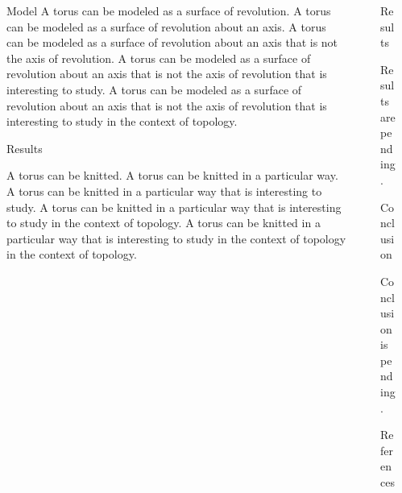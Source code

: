 \documentclass{beamer}
\newlength{\sepwidth}
\newlength{\colwidth}
\newcommand{\separatorcolumn}{\begin{column}{\sepwidth}\end{column}}
\begin{document}
\begin{frame}[t]
\begin{columns}[t]
\begin{column}{\colwidth}
\begin{block}{Model}
A torus can be modeled as a surface of revolution. A torus can be modeled as a surface of revolution about an axis. A torus can be modeled as a surface of revolution about an axis that is not the axis of revolution. A torus can be modeled as a surface of revolution about an axis that is not the axis of revolution that is interesting to study. A torus can be modeled as a surface of revolution about an axis that is not the axis of revolution that is interesting to study in the context of topology.

\end{block}

\begin{block}{Results}

A torus can be knitted. A torus can be knitted in a particular way. A torus can be knitted in a particular way that is interesting to study. A torus can be knitted in a particular way that is interesting to study in the context of topology. A torus can be knitted in a particular way that is interesting to study in the context of topology in the context of topology.

\end{block}

\end{column}
\separatorcolumn%


\begin{column}{\colwidth}

\begin{block}{Results}

Results are pending.

\end{block}

\begin{block}{Conclusion}

Conclusion is pending.

\end{block}

\begin{block}{References}
\begin{multicols}{2}
\fontsize{16pt}{12pt}\selectfont


\end{multicols}
\end{block}

\end{column}
\separatorcolumn%

\end{columns}
\end{frame}
\end{document}
